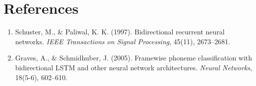 \documentclass[11pt,a4paper]{article}
\theoremstyle{definition}
\begin{document}
\section{References}
\begin{enumerate}
    \item Schuster, M., & Paliwal, K. K. (1997). Bidirectional recurrent neural networks. \emph{IEEE Transactions on Signal Processing}, 45(11), 2673--2681.
    \item Graves, A., & Schmidhuber, J. (2005). Framewise phoneme classification with bidirectional LSTM and other neural network architectures. \emph{Neural Networks}, 18(5-6), 602--610.
\end{enumerate}
\end{document}
